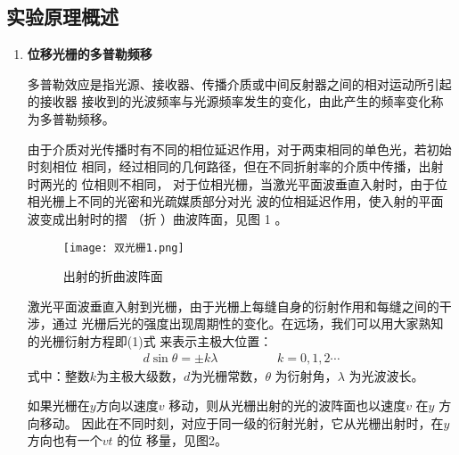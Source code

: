 \documentclass[dvipsnames, svgnames,a4paper,11pt]{article}
\begin{document}
\subsection{实验原理概述}
\begin{enumerate}
    \item \textbf{位移光栅的多普勒频移}\par
    多普勒效应是指光源、接收器、传播介质或中间反射器之间的相对运动所引起的接收器
    接收到的光波频率与光源频率发生的变化，由此产生的频率变化称为多普勒频移。

    由于介质对光传播时有不同的相位延迟作用，对于两束相同的单色光，若初始时刻相位
    相同，经过相同的几何路径，但在不同折射率的介质中传播，出射时两光的 位相则不相同，
    对于位相光栅，当激光平面波垂直入射时，由于位相光栅上不同的光密和光疏媒质部分对光
    波的位相延迟作用，使入射的平面波变成出射时的摺 （折 ）曲波阵面，见图 1 。
    \begin{figure}[H]
        \centering
        \texttt{[image: 双光栅1.png]}
        \caption{出射的折曲波阵面}
    \end{figure}
    激光平面波垂直入射到光栅，由于光栅上每缝自身的衍射作用和每缝之间的干涉，通过
    光栅后光的强度出现周期性的变化。在远场，我们可以用大家熟知的光栅衍射方程即(1)式
    来表示主极大位置：
    \begin{align}
        d\sin\theta=\pm k\lambda\hspace{2cm}k=0,1,2\cdots
    \end{align}
    式中：整数$k$为主极大级数，$d $为光栅常数，$\theta$ 为衍射角，$\lambda$ 为光波波长。

    如果光栅在$y$方向以速度$v$ 移动，则从光栅出射的光的波阵面也以速度$v$ 在$y$ 方向移动。
    因此在不同时刻，对应于同一级的衍射光射，它从光栅出射时，在$y$ 方向也有一个$vt$ 的位
    移量，见图2。


\end{enumerate}
\end{document}

